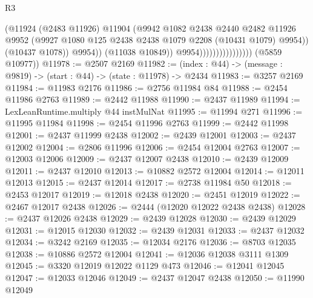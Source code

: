 \begin{lexlean}{R3}
\begin{coremodule}
                                            (@11924
                                              (@2483 @11926)
                                              @11904
                                              (@9942
                                                @1082
                                                @2438
                                                @2440
                                                @2482
                                                @11926
                                                @9952
                                                (@9927
                                                  @1080
                                                  @125
                                                  @2438
                                                  @2438
                                                  @1079
                                                  @2208
                                                  (@10431 @1079)
                                                  @9954))
                                              (@10437 @1078))
                                            @9954))
                                        (@11038 @10849))
                                      @9954))))))))))))))))
      (@5859 @10977))
@11978 := @2507 @2169
@11982 := (index : @44) -> (message : @9819) -> (start : @44) -> (state : @11978) -> @2434
@11983 := @3257 @2169
@11984 := @11983 @2176
@11986 := @2756 @11984 @84
@11988 := @2454 @11986 @2763
@11989 := @2442 @11988
@11990 := @2437 @11989
@11994 := LexLeanRuntime.multiply @44 instMulNat
@11995 := @11994 @271
@11996 := @11995 @11984
@11998 := @2454 @11996 @2763
@11999 := @2442 @11998
@12001 := @2437 @11999 @2438
@12002 := @2439 @12001
@12003 := @2437 @12002
@12004 := @2806 @11996
@12006 := @2454 @12004 @2763
@12007 := @12003 @12006
@12009 := @2437 @12007 @2438
@12010 := @2439 @12009
@12011 := @2437 @12010
@12013 := @10882 @2572 @12004
@12014 := @12011 @12013
@12015 := @2437 @12014
@12017 := @2738 @11984 @50
@12018 := @2453 @12017
@12019 := @12018 @2438
@12020 := @2451 @12019
@12022 := @2467 @12017 @2438
@12026 := @2444 (@12020 @12022 @2438 @2438)
@12028 := @2437 @12026 @2438
@12029 := @2439 @12028
@12030 := @2439 @12029
@12031 := @12015 @12030
@12032 := @2439 @12031
@12033 := @2437 @12032
@12034 := @3242 @2169
@12035 := @12034 @2176
@12036 := @8703 @12035
@12038 := @10886 @2572 @12004
@12041 := @12036 @12038 @3111 @1309
@12045 := @3320 @12019 @12022 @1129 @473
@12046 := @12041 @12045
@12047 := @12033 @12046
@12049 := @2437 @12047 @2438
@12050 := @11990 @12049

\end{coremodule}
\end{lexlean}
